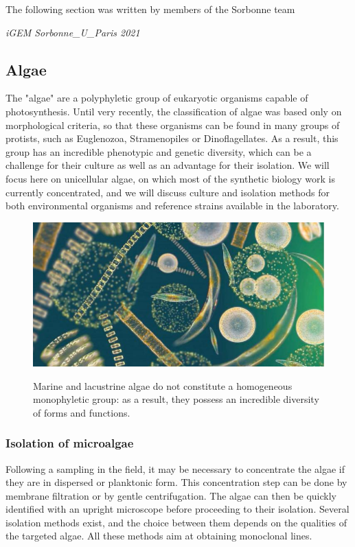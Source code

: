 \epigraph{The following section was written by members of the Sorbonne team}{\textit{iGEM Sorbonne\_U\_Paris 2021}}
\subsection{Algae}
The "algae" are a polyphyletic group of eukaryotic organisms capable of photosynthesis. Until very recently, the classification of algae was based only on morphological criteria, so that these organisms can be found in many groups of protists, such as Euglenozoa, Stramenopiles or Dinoflagellates. As a result, this group has an incredible phenotypic and genetic diversity, which can be a challenge for their culture as well as an advantage for their isolation. We will focus here on unicellular algae, on which most of the synthetic biology work is currently concentrated, and we will discuss culture and isolation methods for both environmental organisms and reference strains available in the laboratory.
\begin{figure}[!htbp]
    \centering
    \includegraphics[width=\textwidth]{images/chap2/chap2_alg_01.png}
    \label{fig:ch2alg01}
    \caption{Marine and lacustrine algae do not constitute a homogeneous monophyletic group: as a result, they possess an incredible diversity of forms and functions.} 
\end{figure}
\FloatBarrier
 \noindent
\subsubsection{Isolation of microalgae}
Following a sampling in the field, it may be necessary to concentrate the algae if they are in dispersed or planktonic form. This concentration step can be done by membrane filtration or by gentle centrifugation. The algae can then be quickly identified with an upright microscope before proceeding to their isolation. Several isolation methods exist, and the choice between them depends on the qualities of the targeted algae. All these methods aim at obtaining monoclonal lines.
